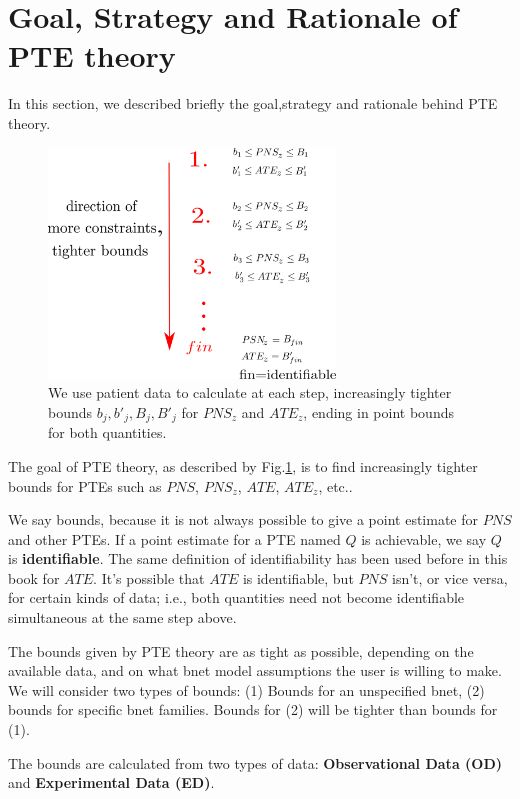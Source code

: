 \section{Goal, Strategy
and Rationale of PTE theory}
In this section,
we described
briefly
the goal,strategy
and rationale behind PTE theory.


\begin{figure}[h!]
\centering
\includegraphics[width=3in]
{personalized/personalized-goal.png}
\caption{We use patient data
to calculate at each step, increasingly
tighter bounds
$b_j, b'_j, B_j, B'_j$
for $PNS_z$ and $ATE_z$,
ending in point bounds
for both quantities. }
\label{fig-personalized-goal}
\end{figure}

The goal of PTE theory, as
described by
Fig.\ref{fig-personalized-goal}, is
to find
increasingly
tighter bounds for
PTEs such as $PNS$,
$PNS_z$, $ATE$, $ATE_z$, etc..


We say bounds, because
it is not always possible
to give a point estimate
for $PNS$ and other
PTEs.
If a point estimate for a PTE named $Q$
is achievable, we say $Q$
is {\bf identifiable}.
The same definition
of identifiability
has been used before in this book
for $ATE$.
It's possible that
$ATE$ is identifiable,
but $PNS$ isn't,
or vice versa, for certain kinds
of data; i.e., both
quantities need not
become identifiable
simultaneous at the
same step above.


 The
bounds given by PTE theory
are
as tight as possible,
depending on
the available data,
and on what bnet model
assumptions
the user is willing to make.
We will consider two types of bounds:
(1) Bounds for an unspecified bnet,
(2) bounds for specific bnet families.
Bounds for (2) will be tighter
than bounds for (1).


The bounds are calculated from
 two types of data:
{\bf Observational Data (OD)} and
{\bf Experimental Data (ED)}.


